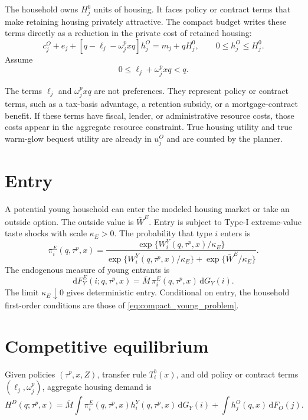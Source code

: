 \documentclass[11pt]{article}
\newcommand{\dd}{\mathrm d}
\newcommand{\1}{\mathbf 1}
\begin{document}
The household owns $H_j^0$ units of housing. It faces policy or contract terms that make retaining housing privately attractive. The compact budget writes these terms directly as a reduction in the private cost of retained housing:
\begin{equation}
c_j^O+e_j+
\left[q-\ell_j-\omega_j^p xq\right]h_j^O
=
m_j+qH_j^0,
\qquad
0\le h_j^O\le H_j^0.
\label{eq:compact_old_budget}
\end{equation}
Assume
\begin{equation}
0\le \ell_j+\omega_j^p xq<q.
\label{eq:compact_old_private_cost_positive}
\end{equation}

The terms $\ell_j$ and $\omega_j^p xq$ are not preferences. They represent policy or contract terms, such as a tax-basis advantage, a retention subsidy, or a mortgage-contract benefit. If these terms have fiscal, lender, or administrative resource costs, those costs appear in the aggregate resource constraint. True housing utility and true warm-glow bequest utility are already in $u_j^O$ and are counted by the planner.

\section{Entry}

A potential young household can enter the modeled housing market or take an outside option. The outside value is $\bar W^E$. Entry is subject to Type-I extreme-value taste shocks with scale $\kappa_E>0$. The probability that type $i$ enters is
\begin{equation}
\pi_i^E(q,\tau^p,x)
=
\frac{
\exp\{W_i^Y(q,\tau^p,x)/\kappa_E\}
}{
\exp\{W_i^Y(q,\tau^p,x)/\kappa_E\}
+
\exp\{\bar W^E/\kappa_E\}
}.
\label{eq:compact_entry_prob}
\end{equation}
The endogenous measure of young entrants is
\begin{equation}
\dd F_Y^E(i;q,\tau^p,x)
=
\bar M\,\pi_i^E(q,\tau^p,x)\,\dd G_Y(i).
\label{eq:compact_entry_measure}
\end{equation}
The limit $\kappa_E\downarrow0$ gives deterministic entry. Conditional on entry, the household first-order conditions are those of \eqref{eq:compact_young_problem}.

\section{Competitive equilibrium}

Given policies $(\tau^p,x,Z)$, transfer rule $T_i^b(x)$, and old policy or contract terms $(\ell_j,\omega_j^p)$, aggregate housing demand is
\begin{equation}
H^D(q;\tau^p,x)
=
\bar M
\int
\pi_i^E(q,\tau^p,x)
h_i^Y(q,\tau^p,x)
\,\dd G_Y(i)
+
\int h_j^O(q,x)\,\dd F_O(j).
\label{eq:compact_hd}
\end{equation}
\end{document}
